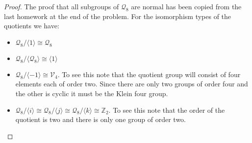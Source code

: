 \documentclass[10pt]{article}
\newcommand{\bb}[1]{\mathbb{#1}}
\theoremstyle{plain}
\theoremstyle{remark}
\begin{document}
\begin{proof}
  The proof that all subgroups of $\mathcal{Q}_8$ are normal has been copied from
  the last homework at the end of the problem. For the isomorphism types of the
  quotients we have:
  \begin{itemize}
  \item $\mathcal{Q}_8/\langle 1\rangle\cong \mathcal{Q}_8$
  \item $\mathcal{Q}_8/\langle\mathcal{Q}_8\rangle\cong \langle 1\rangle$
  \item $\mathcal{Q}_8/\langle-1\rangle\cong \mathcal{V}_4$. To see this note that the
    quotient group will consist of four elements each of order two. Since
    there are only two groups of order four and the other is cyclic it must
    be the Klein four group.
  \item $\mathcal{Q}_8/\langle i\rangle\cong\mathcal{Q}_8/\langle j\rangle\cong\mathcal{Q}_8/\langle k\rangle\cong \bb{Z}_2$. To
    see this note that the order of the quotient is two and there is only one
    group of order two.
  \end{itemize}


\end{proof}
\end{document}
